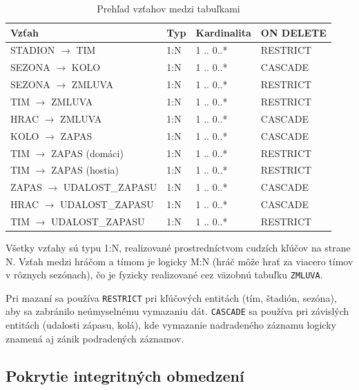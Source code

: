 \documentclass[11pt, a4paper]{article}
\begin{document}
\begin{table}[H]
    \centering
    \caption{Prehľad vzťahov medzi tabuľkami}
    \label{tab:vztahy}
    \begin{tabular}{l l l l}
        \toprule
        \textbf{Vzťah} & \textbf{Typ} & \textbf{Kardinalita} & \textbf{ON DELETE} \\
        \midrule
        STADION $\rightarrow$ TIM             & 1:N & 1 .. 0..* & RESTRICT \\
        SEZONA $\rightarrow$ KOLO             & 1:N & 1 .. 0..* & CASCADE \\
        SEZONA $\rightarrow$ ZMLUVA           & 1:N & 1 .. 0..* & RESTRICT \\
        TIM $\rightarrow$ ZMLUVA              & 1:N & 1 .. 0..* & RESTRICT \\
        HRAC $\rightarrow$ ZMLUVA             & 1:N & 1 .. 0..* & CASCADE \\
        KOLO $\rightarrow$ ZAPAS              & 1:N & 1 .. 0..* & CASCADE \\
        TIM $\rightarrow$ ZAPAS (domáci)      & 1:N & 1 .. 0..* & RESTRICT \\
        TIM $\rightarrow$ ZAPAS (hostia)      & 1:N & 1 .. 0..* & RESTRICT \\
        ZAPAS $\rightarrow$ UDALOST\_ZAPASU   & 1:N & 1 .. 0..* & CASCADE \\
        HRAC $\rightarrow$ UDALOST\_ZAPASU    & 1:N & 1 .. 0..* & CASCADE \\
        TIM $\rightarrow$ UDALOST\_ZAPASU     & 1:N & 1 .. 0..* & RESTRICT \\
        \bottomrule
    \end{tabular}
\end{table}

Všetky vzťahy sú typu 1:N, realizované prostredníctvom cudzích kľúčov na strane N. Vzťah medzi hráčom a tímom je logicky M:N (hráč môže hrať za viacero tímov v rôznych sezónach), čo je fyzicky realizované cez väzobnú tabuľku \texttt{ZMLUVA}.

Pri mazaní sa používa \texttt{RESTRICT} pri kľúčových entitách (tím, štadión, sezóna), aby sa zabránilo neúmyselnému vymazaniu dát. \texttt{CASCADE} sa používa pri závislých entitách (udalosti zápasu, kolá), kde vymazanie nadradeného záznamu logicky znamená aj zánik podradených záznamov.

\subsection{Pokrytie integritných obmedzení}
\end{document}
